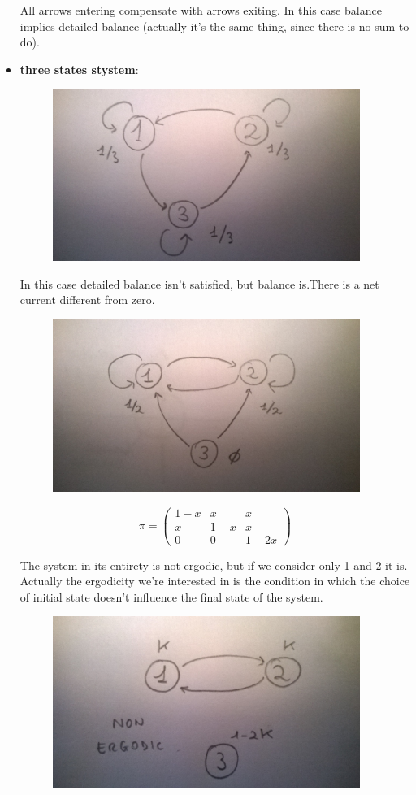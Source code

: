 \documentclass[a4paper, italian, openany]{book}
\begin{document}
\begin{itemize}
All arrows entering compensate with arrows exiting. In this case balance implies detailed balance (actually it's the same thing, since there is no sum to do).

\item \textbf{three states stystem}:

\begin{figure}[H]
\centering
\includegraphics[width=100mm]{img/pic14.jpg}
\end{figure}

In this case detailed balance isn't satisfied, but balance is.There is a net current different from zero.

\begin{figure}[H]
\centering
\includegraphics[width=100mm]{img/pic15.jpg}
\end{figure}

$$\pi = \left ( \begin{array}{ccc} 1-x & x & x \\ x & 1-x & x \\ 0 & 0 & 1-2x \end{array} \right )$$

The system in its entirety is not ergodic, but if we consider only 1 and 2 it is. Actually the ergodicity we're interested in is the condition in which the choice of initial state doesn't influence the final state of the system.

\begin{figure}[H]
\centering
\includegraphics[width=100mm]{img/pic16.jpg}
\end{figure}


\end{itemize}
\end{document}

